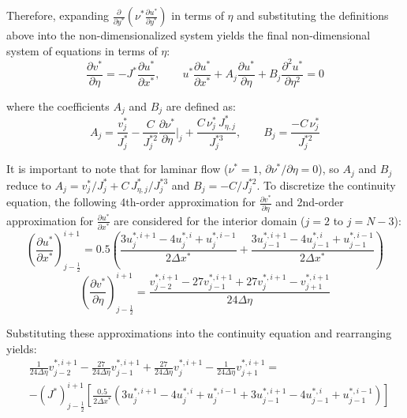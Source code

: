 \documentclass[letterpaper,12pt]{article}
\begin{document}
Therefore, expanding $\frac{\partial}{\partial y^*}\left(\nu^* \frac{\partial u^*}{\partial y^*}\right)$ in terms of $\eta$ and substituting the definitions above into the non-dimensionalized system yields the final non-dimensional system of equations in terms of  $\eta$:
\begin{equation}
    \frac{\partial v^*}{\partial \eta} = -J^* \frac{\partial u^*}{\partial x^*}, \qquad u^* \frac{\partial u^*}{\partial x^*} + A_j \frac{\partial u^*}{\partial \eta} + B_j \frac{\partial^2 u^*}{\partial \eta^2} = 0
\end{equation}

where the coefficients $A_j$ and $B_j$ are defined as:
\begin{equation}
A_j = \frac{v^*_j}{J^*_j} - \frac{C}{J^{*2}_j}\frac{\partial \nu^*}{\partial \eta}\bigg|_j + \frac{C\,\nu^*_j\, J^*_{\eta,j}}{J^{*3}_j}, \qquad B_j = \frac{-C\,\nu^*_j}{J^{*2}_j}
\end{equation}

It is important to note that for laminar flow ($\nu^* = 1$, $\partial\nu^*/\partial\eta = 0$), so $A_j$ and $B_j$ reduce to $A_j = v^*_j/J^*_j + C\,J^*_{\eta,j}/J^{*3}_j$ and $B_j = -C/J^{*2}_j$. To discretize the continuity equation, the following 4th-order approximation for $\frac{\partial v^*}{\partial \eta}$ and 2nd-order approximation for $\frac{\partial u^*}{\partial x^*}$ are considered for the interior domain ($j=2$ to $j=N-3$):
\begin{equation}
    \left( \frac{\partial u^*}{\partial x^*} \right)^{i+1}_{j-\frac{1}{2}} = 0.5 \left( \frac{3 u_{j}^{*,i+1} - 4 u_{j}^{*,i} + u_{j}^{*,i-1}}{2 \Delta x^*} + \frac{3 u_{j-1}^{*,i+1} - 4 u_{j-1}^{*,i} + u_{j-1}^{*,i-1}}{2 \Delta x^*}  \right)
\end{equation}
\begin{equation}
    \left( \frac{\partial v^*}{\partial \eta} \right)^{i+1}_{j-\frac{1}{2}} = \frac{v_{j-2}^{*,i+1} -27 v_{j-1}^{*,i+1} + 27 v_{j}^{*,i+1} - v_{j+1}^{*,i+1}}{24 \Delta \eta}
\end{equation}

Substituting these approximations into the continuity equation and rearranging yields:
\begin{equation}
\begin{aligned}
    &\frac{1}{24 \Delta \eta} v_{j-2}^{*,i+1} - \frac{27}{24 \Delta \eta} v_{j-1}^{*,i+1} + \frac{27}{24 \Delta \eta} v_{j}^{*,i+1} - \frac{1}{24 \Delta \eta} v_{j+1}^{*,i+1} = \\
    & - \left(J^* \right)^{i+1}_{j-\frac{1}{2}} \left[ \frac{0.5}{2 \Delta x^*} \left( 3u_{j}^{*,i+1} - 4 u_{j}^{*,i} + u_{j}^{*,i-1} + 3 u_{j-1}^{*,i+1} - 4 u_{j-1}^{*,i} + u_{j-1}^{*,i-1} \right) \right]
\end{aligned}
\end{equation}
\end{document}
